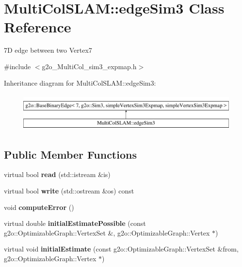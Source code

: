 \hypertarget{classMultiColSLAM_1_1edgeSim3}{}\section{Multi\+Col\+S\+L\+AM\+:\+:edge\+Sim3 Class Reference}
\label{classMultiColSLAM_1_1edgeSim3}


7D edge between two Vertex7  




{\ttfamily \#include $<$g2o\+\_\+\+Multi\+Col\+\_\+sim3\+\_\+expmap.\+h$>$}

Inheritance diagram for Multi\+Col\+S\+L\+AM\+:\+:edge\+Sim3\+:\begin{figure}[H]
\begin{center}
\leavevmode
\includegraphics[height=2.000000cm]{classMultiColSLAM_1_1edgeSim3}
\end{center}
\end{figure}
\subsection*{Public Member Functions}
\begin{DoxyCompactItemize}
\item 
virtual bool {\bfseries read} (std\+::istream \&is)\hypertarget{classMultiColSLAM_1_1edgeSim3_a6d0a00d574e2790489dd7e339eea6e14}{}\label{classMultiColSLAM_1_1edgeSim3_a6d0a00d574e2790489dd7e339eea6e14}

\item 
virtual bool {\bfseries write} (std\+::ostream \&os) const \hypertarget{classMultiColSLAM_1_1edgeSim3_ae78172a053808aecbea596c90d199b13}{}\label{classMultiColSLAM_1_1edgeSim3_ae78172a053808aecbea596c90d199b13}

\item 
void {\bfseries compute\+Error} ()\hypertarget{classMultiColSLAM_1_1edgeSim3_a3109ef0d6e822daa23e3626234d75238}{}\label{classMultiColSLAM_1_1edgeSim3_a3109ef0d6e822daa23e3626234d75238}

\item 
virtual double {\bfseries initial\+Estimate\+Possible} (const g2o\+::\+Optimizable\+Graph\+::\+Vertex\+Set \&, g2o\+::\+Optimizable\+Graph\+::\+Vertex $\ast$)\hypertarget{classMultiColSLAM_1_1edgeSim3_a52be452ec95d32092c3c2ccea82dd4d0}{}\label{classMultiColSLAM_1_1edgeSim3_a52be452ec95d32092c3c2ccea82dd4d0}

\item 
virtual void {\bfseries initial\+Estimate} (const g2o\+::\+Optimizable\+Graph\+::\+Vertex\+Set \&from, g2o\+::\+Optimizable\+Graph\+::\+Vertex $\ast$)\hypertarget{classMultiColSLAM_1_1edgeSim3_a51b1391315d26872608b3cc215b25960}{}\label{classMultiColSLAM_1_1edgeSim3_a51b1391315d26872608b3cc215b25960}

\end{DoxyCompactItemize}


